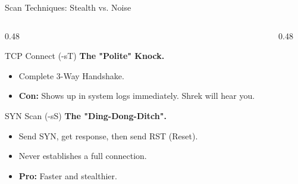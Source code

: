 \documentclass[aspectratio=169]{beamer}  %
\begin{document}
\begin{frame}{Scan Techniques: Stealth vs. Noise}
    \begin{columns}[T]
        \begin{column}{0.48\textwidth}
            \begin{block}{TCP Connect (-sT)}
                \footnotesize
                \textbf{The "Polite" Knock.}
                \begin{itemize}
                    \item Complete 3-Way Handshake.
                    \item \textbf{Con:} Shows up in system logs immediately. Shrek will hear you.
                \end{itemize}
            \end{block}
            \begin{block}{SYN Scan (-sS)}
                \footnotesize
                \textbf{The "Ding-Dong-Ditch".}
                \begin{itemize}
                    \item Send SYN, get response, then send RST (Reset).
                    \item Never establishes a full connection.
                    \item \textbf{Pro:} Faster and stealthier.
                \end{itemize}
            \end{block}
        \end{column}
        \begin{column}{0.48\textwidth}
            \begin{center}
\end{center}
\end{column}
\end{columns}
\end{frame}
\end{document}
